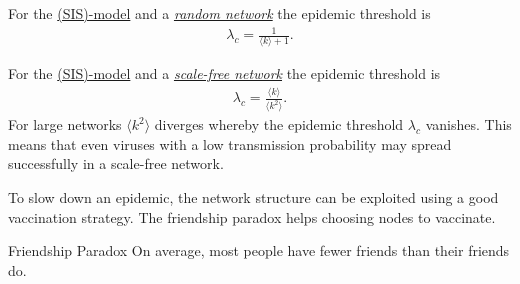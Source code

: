 \documentclass[english]{panikzettel}
\begin{document}
For the \hyperref[sec:sis_model]{(SIS)-model} and a \hyperref[sec:erdosrenyi_model]{\textit{random network}} the epidemic threshold is
\begin{align*}
	\lambda_c = \frac{1}{\langle k \rangle + 1}.
\end{align*}

For the \hyperref[sec:sis_model]{(SIS)-model} and a \hyperref[sec:barabasi_albert_model]{\textit{scale-free network}} the epidemic threshold is
\begin{align*}
	\lambda_c = \frac{\langle k \rangle}{\langle k^2 \rangle}.
\end{align*}
For large networks $ \langle k^2 \rangle $ diverges whereby the epidemic threshold $ \lambda_c $ vanishes.
This means that even viruses with a low transmission probability may spread successfully in a scale-free network.

To slow down an epidemic, the network structure can be exploited using a good vaccination strategy.
The friendship paradox helps choosing nodes to vaccinate.

\begin{theo}{Friendship Paradox}
	On average, most people have fewer friends than their friends do.
\end{theo}
\end{document}
